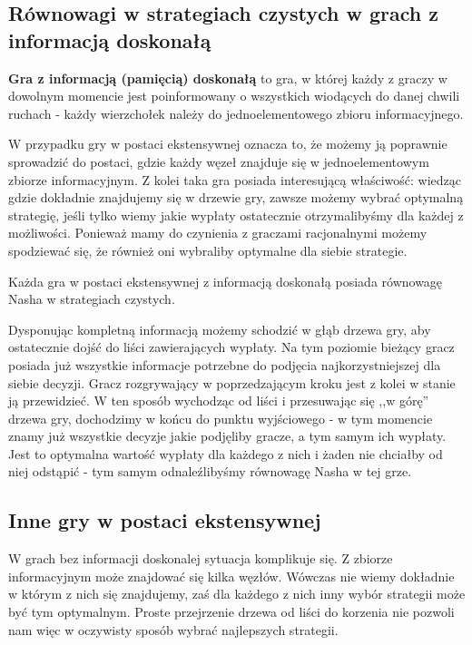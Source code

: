 \documentclass[polish]{standalone}
\begin{document}
\subsection{Równowagi w strategiach czystych w grach z informacją doskonałą}

\begin{definition}
\textbf{Gra z informacją (pamięcią) doskonałą} to gra, w której każdy z graczy w dowolnym
momencie jest poinformowany o wszystkich wiodących do danej chwili ruchach - każdy wierzchołek należy do
jednoelementowego zbioru informacyjnego.
\cite[str.~81]{FT-GT}
\end{definition}

W przypadku gry w postaci ekstensywnej oznacza to, że możemy ją poprawnie sprowadzić do postaci, gdzie każdy węzeł
znajduje się w jednoelementowym zbiorze informacyjnym. Z kolei taka gra posiada interesującą właściwość: wiedząc gdzie
dokładnie znajdujemy się w drzewie gry, zawsze możemy wybrać optymalną strategię, jeśli tylko wiemy jakie wypłaty
ostatecznie otrzymalibyśmy dla każdej z możliwości. Ponieważ mamy do czynienia z graczami racjonalnymi możemy spodziewać
się, że również oni wybraliby optymalne dla siebie strategie.

\begin{theorem}
Każda gra w postaci ekstensywnej z informacją doskonałą posiada równowagę Nasha w strategiach czystych.
\cite[str.~91]{FT-GT}
\end{theorem}

Dysponując kompletną informacją możemy schodzić w głąb drzewa gry, aby ostatecznie dojść do liści zawierających wypłaty.
Na tym poziomie bieżący gracz posiada już wszystkie informacje potrzebne do podjęcia najkorzystniejszej dla siebie
decyzji. Gracz rozgrywający w poprzedzającym kroku jest z kolei w stanie ją przewidzieć. W ten sposób wychodząc od liści
i przesuwając się ,,w górę'' drzewa gry, dochodzimy w końcu do punktu wyjściowego - w tym momencie znamy już wszystkie
decyzje jakie podjęliby gracze, a tym samym ich wypłaty. Jest to optymalna wartość wypłaty dla każdego z nich i żaden
nie chciałby od niej odstąpić - tym samym odnaleźlibyśmy równowagę Nasha w tej grze.

\subsection{Inne gry w postaci ekstensywnej}

W grach bez informacji doskonalej sytuacja komplikuje się. Z zbiorze informacyjnym może znajdować się kilka węzłów.
Wówczas nie wiemy dokładnie w którym z nich się znajdujemy, zaś dla każdego z nich inny wybór strategii może być tym
optymalnym. Proste przejrzenie drzewa od liści do korzenia nie pozwoli nam więc w oczywisty sposób wybrać najlepszych
strategii.
\end{document}
